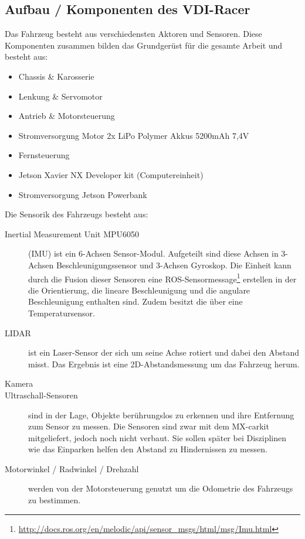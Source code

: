 \bigskip 

\subsection{Aufbau / Komponenten des VDI-Racer}
\label{sec:VDI-Racer-Aufbau}

Das Fahrzeug besteht aus verschiedensten Aktoren und Sensoren. Diese Komponenten zusammen bilden das Grundgerüst für die gesamte Arbeit und besteht aus:

\begin{itemize}
    \item Chassis \& Karosserie
    \item Lenkung \& Servomotor
    \item Antrieb \& Motorsteuerung
    \item Stromversorgung Motor 2x LiPo Polymer Akkus 5200mAh 7,4V
    \item Fernsteuerung
    \item Jetson Xavier NX Developer kit (Computereinheit)
    \item Stromversorgung Jetson Powerbank
\end{itemize}

Die Sensorik des Fahrzeugs besteht aus:
\begin{description}
    \item [Inertial Measurement Unit MPU6050] (IMU) ist ein 6-Achsen Sensor-Modul. Aufgeteilt sind diese Achsen in 3-Achsen Beschleunigungssensor und 3-Achsen Gyroskop. Die Einheit kann durch die Fusion dieser Sensoren eine ROS-Sensormessage\footnote{\url{http://docs.ros.org/en/melodic/api/sensor_msgs/html/msg/Imu.html}} erstellen in der die Orientierung, die lineare Beschleunigung und die angulare Beschleunigung enthalten sind. Zudem besitzt die  über eine Temperatursensor.

    \item [LIDAR] ist ein Laser-Sensor der sich um seine Achse rotiert und dabei den Abstand misst. Das Ergebnis ist eine 2D-Abstandsmessung um das Fahrzeug herum.
    
    \item [Kamera] 
    
    \item [Ultraschall-Sensoren] sind in der Lage, Objekte berührungslos zu erkennen und ihre Entfernung zum Sensor zu messen. Die Sensoren sind zwar mit dem MX-carkit mitgeliefert, jedoch noch nicht verbaut. Sie sollen später bei Disziplinen wie das Einparken helfen den Abstand zu Hindernissen zu messen.
    
    \item [Motorwinkel / Radwinkel / Drehzahl] werden von der Motorsteuerung genutzt um die Odometrie des Fahrzeugs zu bestimmen.
\end{description}
\cite{MXcarkitSpec}

